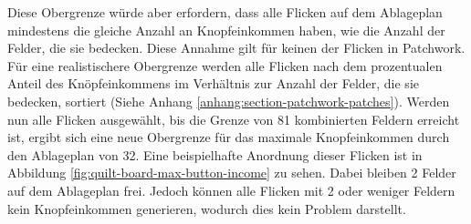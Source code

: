Diese Obergrenze würde aber erfordern, dass alle Flicken auf dem Ablageplan mindestens die gleiche Anzahl an Knopfeinkommen haben, wie die Anzahl der Felder, die sie bedecken. Diese Annahme gilt für keinen der Flicken in Patchwork. Für eine realistischere Obergrenze werden alle Flicken nach dem prozentualen Anteil des Knöpfeinkommens im Verhältnis zur Anzahl der Felder, die sie bedecken, sortiert (Siehe Anhang \ref{anhang:section-patchwork-patches}). Werden nun alle Flicken ausgewählt, bis die Grenze von 81 kombinierten Feldern erreicht ist, ergibt sich eine neue Obergrenze für das maximale Knopfeinkommen durch den Ablageplan von 32. Eine beispielhafte Anordnung dieser Flicken ist in Abbildung \ref{fig:quilt-board-max-button-income} zu sehen. Dabei bleiben 2 Felder auf dem Ablageplan frei. Jedoch können alle Flicken mit 2 oder weniger Feldern kein Knopfeinkommen generieren, wodurch dies kein Problem darstellt.

